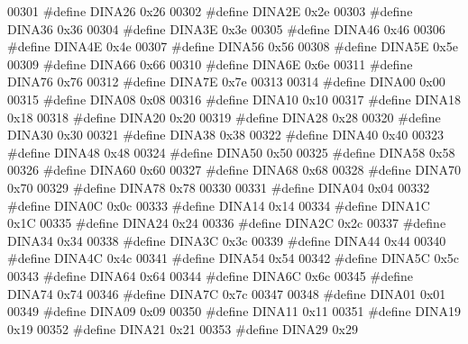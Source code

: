\begin{DoxyCode}
00301 \textcolor{preprocessor}{#define DINA26 0x26}
00302 \textcolor{preprocessor}{#define DINA2E 0x2e}
00303 \textcolor{preprocessor}{#define DINA36 0x36}
00304 \textcolor{preprocessor}{#define DINA3E 0x3e}
00305 \textcolor{preprocessor}{#define DINA46 0x46}
00306 \textcolor{preprocessor}{#define DINA4E 0x4e}
00307 \textcolor{preprocessor}{#define DINA56 0x56}
00308 \textcolor{preprocessor}{#define DINA5E 0x5e}
00309 \textcolor{preprocessor}{#define DINA66 0x66}
00310 \textcolor{preprocessor}{#define DINA6E 0x6e}
00311 \textcolor{preprocessor}{#define DINA76 0x76}
00312 \textcolor{preprocessor}{#define DINA7E 0x7e}
00313 
00314 \textcolor{preprocessor}{#define DINA00 0x00}
00315 \textcolor{preprocessor}{#define DINA08 0x08}
00316 \textcolor{preprocessor}{#define DINA10 0x10}
00317 \textcolor{preprocessor}{#define DINA18 0x18}
00318 \textcolor{preprocessor}{#define DINA20 0x20}
00319 \textcolor{preprocessor}{#define DINA28 0x28}
00320 \textcolor{preprocessor}{#define DINA30 0x30}
00321 \textcolor{preprocessor}{#define DINA38 0x38}
00322 \textcolor{preprocessor}{#define DINA40 0x40}
00323 \textcolor{preprocessor}{#define DINA48 0x48}
00324 \textcolor{preprocessor}{#define DINA50 0x50}
00325 \textcolor{preprocessor}{#define DINA58 0x58}
00326 \textcolor{preprocessor}{#define DINA60 0x60}
00327 \textcolor{preprocessor}{#define DINA68 0x68}
00328 \textcolor{preprocessor}{#define DINA70 0x70}
00329 \textcolor{preprocessor}{#define DINA78 0x78}
00330 
00331 \textcolor{preprocessor}{#define DINA04 0x04}
00332 \textcolor{preprocessor}{#define DINA0C 0x0c}
00333 \textcolor{preprocessor}{#define DINA14 0x14}
00334 \textcolor{preprocessor}{#define DINA1C 0x1C}
00335 \textcolor{preprocessor}{#define DINA24 0x24}
00336 \textcolor{preprocessor}{#define DINA2C 0x2c}
00337 \textcolor{preprocessor}{#define DINA34 0x34}
00338 \textcolor{preprocessor}{#define DINA3C 0x3c}
00339 \textcolor{preprocessor}{#define DINA44 0x44}
00340 \textcolor{preprocessor}{#define DINA4C 0x4c}
00341 \textcolor{preprocessor}{#define DINA54 0x54}
00342 \textcolor{preprocessor}{#define DINA5C 0x5c}
00343 \textcolor{preprocessor}{#define DINA64 0x64}
00344 \textcolor{preprocessor}{#define DINA6C 0x6c}
00345 \textcolor{preprocessor}{#define DINA74 0x74}
00346 \textcolor{preprocessor}{#define DINA7C 0x7c}
00347 
00348 \textcolor{preprocessor}{#define DINA01 0x01}
00349 \textcolor{preprocessor}{#define DINA09 0x09}
00350 \textcolor{preprocessor}{#define DINA11 0x11}
00351 \textcolor{preprocessor}{#define DINA19 0x19}
00352 \textcolor{preprocessor}{#define DINA21 0x21}
00353 \textcolor{preprocessor}{#define DINA29 0x29}

\end{DoxyCode}
